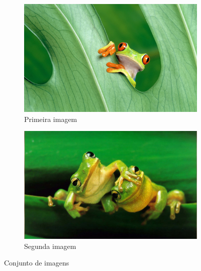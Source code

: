 \begin{figure}[h]
    \centering
    \begin{subfigure}{0.45\textwidth}
        \includegraphics[width=\textwidth]{imagens/sapo1.jpg}
        \caption{Primeira imagem}
    \end{subfigure}
    \hfill
    \begin{subfigure}{0.45\textwidth}
        \includegraphics[width=\textwidth]{imagens/sapo2.jpg}
        \caption{Segunda imagem}
    \end{subfigure}
    \caption{Conjunto de imagens}
    \label{fig:duas-imagens}
\end{figure}

